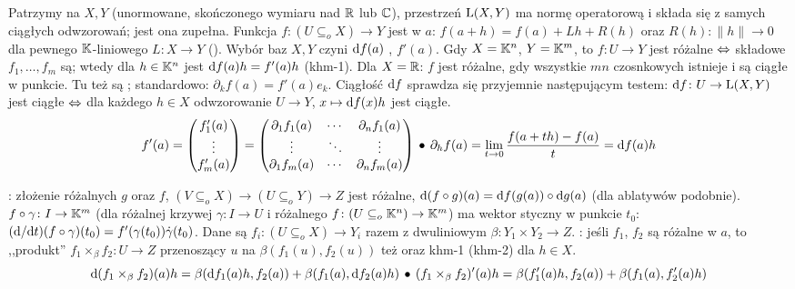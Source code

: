 Patrzymy  na $X, Y$ (unormowane, skończonego wymiaru nad $\mathbb{R}$ lub $\mathbb{C}$), przestrzeń $\textrm L(X, Y)$ ma normę operatorową i składa się z samych ciągłych odwzorowań; jest ona zupełna.
Funkcja $f \colon (U \subseteq_o X) \to Y$ jest  w $a$: $f(a+h) = f(a) + Lh + R(h)$ oraz $R(h) : \|h\| \to 0$ dla pewnego $\mathbb{K}$-liniowego $L \colon X \to Y$ ().
Wybór baz $X, Y$ czyni $\textrm{d}{f}(a)$ ,  $f'(a)$.
Gdy $X = \mathbb{K}^n$, $Y = \mathbb{K}^m$, to $f \colon U \to Y$ jest różalne $\Leftrightarrow$ składowe $f_1, \ldots, f_m$ są; wtedy dla $h \in \mathbb{K}^n$ jest $\textrm{d} f(a) h = f'(a) h$ (khm-1).
Dla $X = \mathbb{R}$: $f$ jest różalne, gdy wszystkie $mn$ czosnkowych istnieje i są ciągłe w punkcie.
Tu też są ; standardowo: $\partial_k f(a) = f'(a) e_k$.
Ciągłość $\textrm{d} f$ sprawdza się przyjemnie następującym testem: $\textrm{d} f \colon U \to \textrm L(X, Y)$ jest ciągłe $\Leftrightarrow$ dla każdego $h \in X$ odwzorowanie $U \to Y$, $x \mapsto \textrm{d} f(x)h$ jest ciągłe.
\[
	f'(a) = \begin{pmatrix} f_1'(a) \\ \vdots \\ f_m'(a) \\ \end{pmatrix}
	= \begin{pmatrix}
	\partial_1 f_1(a) & \cdots & \partial_n f_1(a) \\
	\vdots  &  \ddots & \vdots  \\
	\partial_1 f_m(a) &  \cdots & \partial_n f_m(a)
	\end{pmatrix} \, \bullet \,
	\partial_hf(a) = \lim_{t \to 0} \frac{f(a+th) - f(a)}{t} = \textrm{d}{f(a)}h
\]

:  złożenie różalnych $g$ oraz $f$, $(V \subseteq_o X) \to (U \subseteq_o Y) \to Z$ jest różalne, $\textrm{d}(f \circ g)(a) = \textrm{d} f(g(a)) \circ \textrm{d} g(a)$ (dla ablatywów podobnie).
 $f \circ \gamma \colon I \to \mathbb{K}^m$ (dla różalnej krzywej $\gamma \colon I \to U$ i różalnego $f \colon (U \subseteq_o \mathbb{K}^n) \to \mathbb{K}^m$) ma wektor styczny w punkcie $t_0$: $(\textrm{d}/\textrm{d} t)(f \circ \gamma)(t_0) = f'(\gamma(t_0)) \dot \gamma(t_0)$.
Dane są $f_i \colon (U \subseteq_o X) \to Y_i$ razem z dwuliniowym $\beta \colon Y_1 \times Y_2 \to Z$.
: jeśli $f_1$, $f_2$ są różalne w $a$, to ,,produkt'' $f_1 \times_\beta f_2 \colon U \to Z$ przenoszący $u$ na $\beta(f_1(u), f_2(u))$ też oraz khm-1 (khm-2) dla $h \in X$.
\[
	\textrm{d}{(f_1 \times_\beta f_2)}(a)h = \beta(\textrm{d}{f_1}(a)h,f_2(a)) + \beta(f_1(a), \textrm{d}{f_2}(a)h) \, \bullet \,
	(f_1 \times_\beta f_2)'(a)h = \beta(f_1'(a)h,f_2(a))+\beta(f_1(a), f_2'(a)h)
\]

